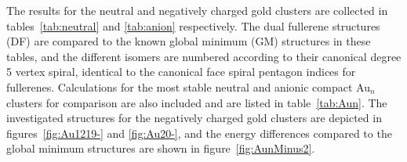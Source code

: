 The results for the neutral and negatively charged gold clusters are collected
in tables~\ref{tab:neutral} and \ref{tab:anion} respectively. The dual fullerene
structures (DF) are compared to the known global minimum (GM) structures in
these tables, and the different isomers are numbered according to their
canonical degree 5 vertex spiral, identical to the canonical face spiral
pentagon indices for fullerenes.\autocite{Fowler-atlas-2006} Calculations for
the most stable neutral and anionic compact Au$_n$ clusters for comparison are
also included and are listed in table~\ref{tab:Aun}. The investigated structures
for the negatively charged gold clusters are depicted in
figures~\ref{fig:Au1219-} and \ref{fig:Au20-}, and the energy differences
compared to the global minimum structures are shown in
figure~\ref{fig:AunMinus2}.
%
%
\begin{figure}[htbp]
	\begin{center}
	\\

\end{center}
\end{figure}

